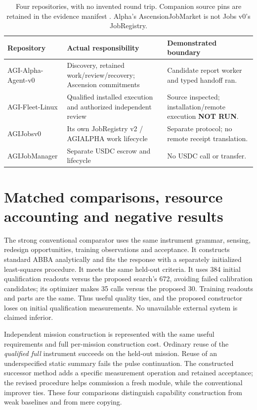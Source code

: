 \documentclass[11pt,letterpaper]{article}
\newcommand{\NotRun}{\textbf{NOT RUN}}
\begin{document}
\begin{table}[ht]
\centering\small
\begin{tabularx}{\linewidth}{@{}p{.19\linewidth}X p{.23\linewidth}@{}}
\toprule
Repository & Actual responsibility & Demonstrated boundary\\\midrule
AGI-Alpha-Agent-v0 & Discovery, retained work/review/recovery; Ascension commitments & Candidate report worker and typed handoff ran.\\
AGI-Fleet-Linux & Qualified installed execution and authorized independent review & Source inspected; installation/remote execution \NotRun.\\
AGIJobsv0 & Its own JobRegistry v2 / AGIALPHA work lifecycle & Separate protocol; no remote receipt translation.\\
AGIJobManager & Separate USDC escrow and lifecycle & No USDC call or transfer.\\\bottomrule
\end{tabularx}
\caption{Four repositories, with no invented round trip. Companion source pins are retained in the evidence manifest \cite{fleetrepo,jobsv0repo,managerrepo}. Alpha's AscensionJobMarket is not Jobs v0's JobRegistry.}
\end{table}

\section{Matched comparisons, resource accounting and negative results}
\label{sec:comparisons}
The strong conventional comparator uses the same instrument grammar, sensing, redesign opportunities, training observations and acceptance. It constructs standard ABBA analytically and fits the response with a separately initialized least-squares procedure. It meets the same held-out criteria. It uses 384 initial qualification readouts versus the proposed search's 672, avoiding failed calibration candidates; its optimizer makes 35 calls versus the proposed 30. Training readouts and parts are the same. Thus useful quality ties, and the proposed constructor loses on initial qualification measurements. No unavailable external system is claimed inferior.

Independent mission construction is represented with the same useful requirements and full per-mission construction cost. Ordinary reuse of the \emph{qualified full} instrument succeeds on the held-out mission. Reuse of an underspecified static summary fails the pulse continuation. The constructed successor method adds a specific measurement operation and retained acceptance; the revised procedure helps commission a fresh module, while the conventional improver ties. These four comparisons distinguish capability construction from weak baselines and from mere copying.
\end{document}
